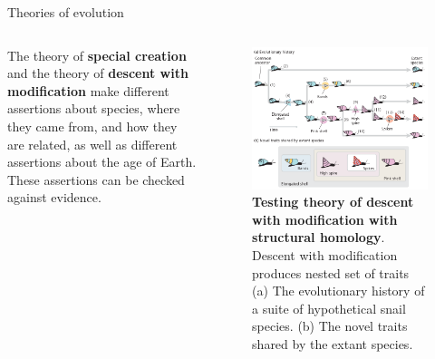 \documentclass[11pt,dvipsnames,ignorenonframetext,aspectratio=169]{beamer}
\begin{document}
\begin{frame}{Theories of evolution}
\protect\hypertarget{theories-of-evolution}{}
\begin{columns}[T,onlytextwidth]

The theory of \textbf{special creation} and the theory of \textbf{descent with modification} make different assertions about species, where they came from, and how they are related, as well as different assertions about the age of Earth. These assertions can be checked against evidence.


\begin{figure}
\includegraphics[width=0.78\linewidth]{../images/descent_with_modification_produces_nested_traits} \caption{\textbf{Testing theory of descent with modification with structural homology}. Descent with modification produces nested set of traits (a) The evolutionary history of a suite of hypothetical snail species. (b) The novel traits shared by the extant species.}\label{fig:descent-with-modification}
\end{figure}

\end{columns}
\end{frame}
\end{document}
